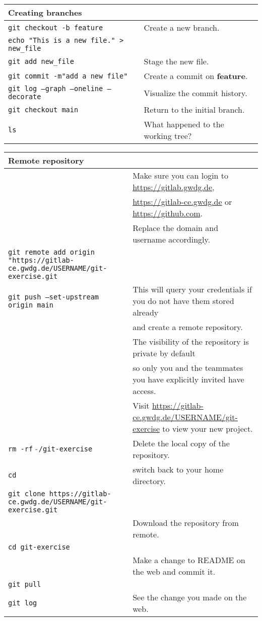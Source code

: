 \documentclass[paper=a4]{scrartcl}
\let\oldtexttt\texttt
\renewcommand{\texttt}[1]{
  \colorbox{bgcolor}{\oldtexttt{#1}}
  }
\begin{document}
\begin{longtable}{ p{} p{}}
        \textbf{Creating branches}\\
        \hline
        \texttt{git checkout -b feature} & Create a new branch.\\
        \texttt{echo "This is a new file." > new\_file} & \\
        \texttt{git add new\_file} & Stage the new file.\\
        \texttt{git commit -m"add a new file"} & Create a commit on \textbf{feature}.\\
        \texttt{git log --graph --oneline --decorate} & Visualize the commit history.\\
        \texttt{git checkout main} & Return to the initial branch.\\
        \texttt{ls} & What happened to the working tree?\\
      \end{longtable}

      \begin{longtable}{ p{} p{}}      
        \textbf{Remote repository}\\
        \hline
        & Make sure you can login to \url{https://gitlab.gwdg.de},\\
        & \url{https://gitlab-ce.gwdg.de} or \url{https://github.com}. \\
        & Replace the domain and username accordingly.\\
        \texttt{git remote add origin "https://gitlab-ce.gwdg.de/USERNAME/git-exercise.git}\\
        \texttt{git push --set-upstream origin main} & This will query your credentials if you do not have them stored already\\
        & and create a remote repository.\\
        & The visibility of the repository is private by default\\
        & so only you and the teammates you have explicitly invited have access.\\
        & Visit \url{https://gitlab-ce.gwdg.de/USERNAME/git-exercise} to view your new project.\\
        \texttt{rm -rf $\tilde{~}$/git-exercise} & Delete the local copy of the repository.\\
        \texttt{cd} & switch back to your home directory.\\
        \texttt{git clone https://gitlab-ce.gwdg.de/USERNAME/git-exercise.git}\\
        & Download the repository from remote.\\
        \texttt{cd git-exercise}\\
        & Make a change to README on the web and commit it.\\
        \texttt{git pull}\\
        \texttt{git log} & See the change you made on the web.\\
\end{longtable}
\end{document}
